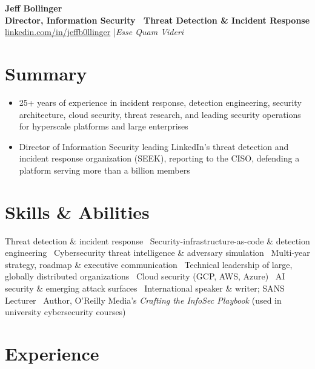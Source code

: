 \documentclass[10.5pt]{article}
\begin{document}
{\Huge\bfseries\color{accent} Jeff Bollinger}\\[2pt]
{\large\bfseries Director, Information Security \textemdash\ Threat Detection \& Incident Response}\\[2pt]
{\small \href{https://linkedin.com/in/jeffb0llinger}{linkedin.com/in/jeffb0llinger} \quad|\quad \textit{Esse Quam Videri}}

\section*{Summary}
\begin{itemize}
  \item 25+ years of experience in incident response, detection engineering, security architecture, cloud security, threat research, and leading security operations for hyperscale platforms and large enterprises
  \item Director of Information Security leading LinkedIn's threat detection and incident response organization (SEEK), reporting to the CISO, defending a platform serving more than a billion members
\end{itemize}

\section*{Skills \& Abilities}
\noindent\small Threat detection \& incident response \textbullet\ Security-infrastructure-as-code \& detection engineering \textbullet\
Cybersecurity threat intelligence \& adversary simulation \textbullet\ Multi-year strategy, roadmap \& executive communication \textbullet\
Technical leadership of large, globally distributed organizations \textbullet\ Cloud security (GCP, AWS, Azure) \textbullet\
AI security \& emerging attack surfaces \textbullet\ International speaker \& writer; SANS Lecturer \textbullet\
Author, O'Reilly Media's \textit{Crafting the InfoSec Playbook} (used in university cybersecurity courses)
\normalsize

\section*{Experience}
\end{document}
